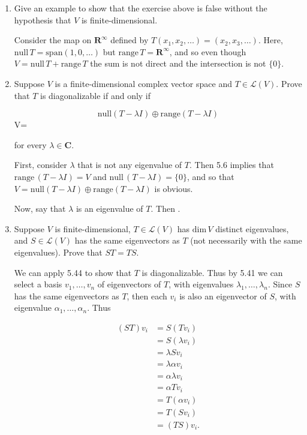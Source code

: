\documentclass{book}
\begin{document}
\begin{enumerate}
(b) \(\rightarrow\) (c): Analogously to the proof of (c) \(\rightarrow\) (a): 3.22 and 2.48 force \(\text{dim} \, (\text{range} \, T \cap \text{null} \, T) = 0)\), and so \(\textrm{null} \, T \cap \textrm{range} \, T = \{0\}\).

\item Give an example to show that the exercise above is false without the hypothesis that \(V\) is finite-dimensional.

Consider the map on \(\textbf{R}^{\infty}\) defined by \(T(x_1,x_2,\dots)=(x_2,x_3,\dots)\).  Here, \(\text{null} \, T = \text{span}(1,0,\dots)\) but \(\text{range} \, T = \textbf{R}^{\infty}\), and so even though \(V=\text{null} \, T + \text{range} \, T\) the sum is not direct and the intersection is not \(\{0\}\).

\item Suppose \(V\) is a finite-dimensional complex vector space and \(T \in \mathcal{L}(V)\).  Prove that \(T\) is diagonalizable if and only if

\begin{equation*}
    \textrm{null}(T-\lambda I) \oplus \textrm{range}(T-\lambda I)
\end{equation*}V=

for every \(\lambda \in \textbf{C}\).

First, consider \(\lambda\) that is not any eigenvalue of \(T\).  Then 5.6 implies that \(\text{range} \, (T-\lambda I) = V\) and \(\text{null} \, (T-\lambda I) = \{0\}\), and so that \(V=\textrm{null}(T-\lambda I) \oplus \textrm{range}(T-\lambda I)\) is obvious.

Now, say that \(\lambda\) is an eigenvalue of \(T\).  Then .

\item Suppose \(V\) is finite-dimensional, \(T \in \mathcal{L}(V)\) has \(\textrm{dim} \, V\) distinct eigenvalues, and \(S \in \mathcal{L}(V)\) has the same eigenvectors as \(T\) (not necessarily with the same eigenvalues).  Prove that \(ST=TS\).

We can apply 5.44 to show that \(T\) is diagonalizable.  Thus by 5.41 we can select a basis \(v_1,\dots,v_n\) of eigenvectors of \(T\), with eigenvalues \(\lambda_1,\dots,\lambda_n\).  Since \(S\) has the same eigenvectors as \(T\), then each \(v_i\) is also an eigenvector of \(S\), with eigenvalue \(\alpha_1,\dots,\alpha_n\).  Thus

\begin{equation*}
    \begin{split}
        (ST)v_i &= S(Tv_i) \\
        &= S(\lambda v_i) \\
        &= \lambda Sv_i \\
        &= \lambda \alpha v_i \\
        &= \alpha \lambda v_i \\
        &= \alpha Tv_i \\
        &= T(\alpha v_i) \\
        &= T(Sv_i) \\
        &= (TS)v_i.
    \end{split}
\end{equation*}


\end{enumerate}
\end{document}
